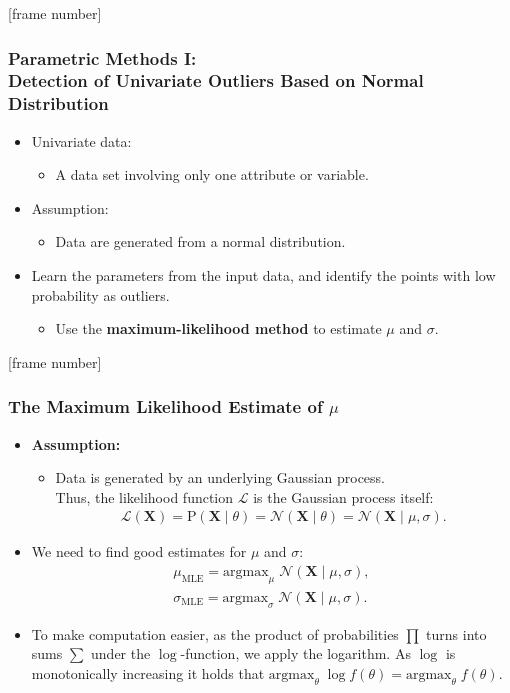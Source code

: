 \documentclass[aspectratio=169,t,xcolor=dvipsnames]{beamer}
\begin{document}
{
[frame number]
\begin{frame}
	\frametitle{Parametric Methods I: \\ Detection of Univariate Outliers Based on Normal Distribution}
	\begin{itemize}
		\item Univariate data:
		      \begin{itemize}
		      	\item A data set involving only one attribute or variable.
		      \end{itemize}
		\item Assumption:
		      \begin{itemize}
		      	\item Data are generated from a normal distribution.
		      \end{itemize}
		\item Learn the parameters from the input data, and identify the points with low probability as outliers.
		      \begin{itemize}
		      	\item Use the \textbf{\color{airforceblue}maximum-likelihood method} to estimate $\mu$ and $\sigma$.
		      \end{itemize}
	\end{itemize}
\end{frame}
}

{
[frame number]
\begin{frame}
	\frametitle{The Maximum Likelihood Estimate of $\mu$}
	\begin{itemize}
		\item \textbf{Assumption:}
		      \begin{itemize}
		      	\item Data is generated by an underlying Gaussian process. \\
            Thus, the likelihood function $\mathcal{L}$ is the Gaussian process itself:
            \begin{align}
              \mathcal{L}(\mathbf{X}) = \text{P}(\mathbf{X} \; \vert \; \theta) = \mathcal{N}(\mathbf{X} \; \vert \; \theta) = \mathcal{N}(\mathbf{X} \; \vert \; \mu, \sigma).
            \end{align}
		      \end{itemize}
    \item We need to find good estimates for $\mu$ and $\sigma$:
    \begin{align}
      \mu_{\text{MLE}} = \text{argmax}_{\mu} \; \mathcal{N}(\mathbf{X} \; \vert \; \mu, \sigma),\\
      \sigma_{\text{MLE}} = \text{argmax}_{\sigma} \; \mathcal{N}(\mathbf{X} \; \vert \; \mu, \sigma).
    \end{align}
    \item To make computation easier, as the product of probabilities $\prod$ turns into sums $\sum$ under the $\log$-function, we apply the logarithm. As $\log$ is monotonically increasing it holds that $\text{argmax}_{\theta} \; \log f(\theta) = \text{argmax}_{\theta} \; f(\theta)$.
	\end{itemize}
\end{frame}
}
\end{document}
